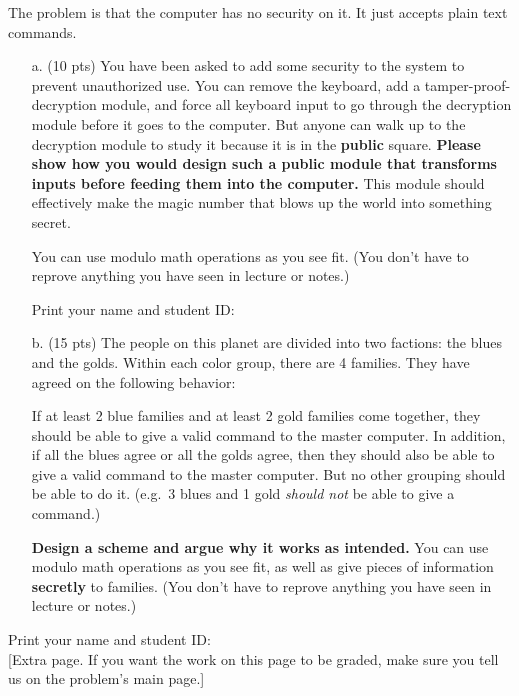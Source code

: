 \documentclass[11pt,fleqn]{article}
\newcommand{\fillin}[1]{\underline{\hskip #1}}
\newcommand{\startnewpage}{\newpage \noindent \vspace{0mm} {\sc Print} your name and student ID: \fillin{5in}\\[-0.2in]}
\begin{document}
\begin{qunlist}

The problem is that the computer has no security on it. It just
accepts plain text commands. 

\begin{itemize}
\item[a. (10 pts)] You have been asked to add some
security to the system to prevent unauthorized use. You can remove the
keyboard, add a tamper-proof-decryption module, and force all keyboard
input to go through the decryption module before it goes to the
computer. But anyone can walk up to the decryption module to study it
because it is in the {\bf public} square. {\bf Please show how you
  would design such a public module that transforms inputs before
  feeding them into the computer.} This module should effectively make
the magic number that blows up the world into something secret. 

You can use modulo math operations as you see fit. (You don't have to
reprove anything you have seen in lecture or notes.)

\startnewpage
\item[b. (15 pts)] The people on this planet are divided into two
  factions: the blues and the golds. Within each color group, there
  are 4 families. They have agreed on the following behavior: 

If at least 2 blue families and at least 2 gold families come
together, they should be able to give a valid command to the master
computer. In addition, if all the blues agree or all the golds agree,
then they should also be able to give a valid command to the master
computer. But no other grouping should be able to do it. (e.g.~3 blues
and 1 gold {\em should not} be able to give a command.)

{\bf Design a scheme and argue why it works as intended.} You can use
modulo  math operations as you see fit, as well as give pieces of
information {\bf secretly} to families. (You don't have to reprove
anything you have seen in lecture or notes.)
\end{itemize}

\startnewpage

[Extra page. If you want the work on this page to be graded, make sure you tell us on the problem's main page.]


\end{qunlist}
\end{document}
